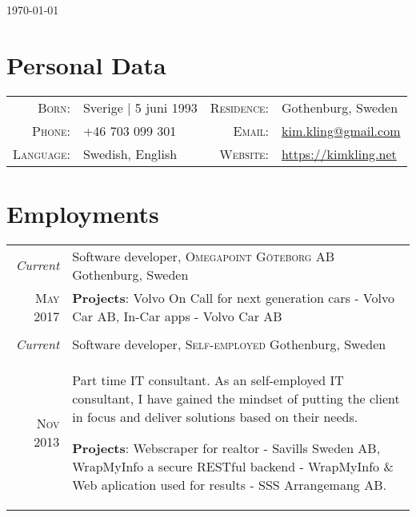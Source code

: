 \documentclass[a4paper,10pt]{scrartcl} %
\begin{document}
\pagestyle{empty} %


\hfill {\small \today}
\par{
	\bigskip\par
	
}



\section{Personal Data}
\begin{tabular}{rp{6cm}rl}
	\textsc{Born:}      & Sverige | 5 juni 1993 &
	\textsc{Residence:} & Gothenburg, Sweden \\

	\textsc{Phone:}     & +46 703 099 301 & 
	\textsc{Email:}     & \href{mailto:kim.kling@gmail.com}{kim.kling@gmail.com} \\

	\textsc{Language:}  & Swedish, English & 
	\textsc{Website:}   & \href{https://kimkling.net}{https://kimkling.net}
\end{tabular}



\section{Employments}

\begin{tabular}{r|p{15cm}}
\emph{Current} 	                    & Software developer, \textsc{Omegapoint Göteborg AB} \hfill Gothenburg, Sweden \\
\textsc{May 2017}                   & \footnotesize{
\textbf{Projects}: Volvo On Call for next generation cars - Volvo Car AB, In-Car apps - Volvo Car AB} \\
\multicolumn{2}{c}{} \\


\emph{Current} 	                    & Software developer, \textsc{Self-employed} \hfill Gothenburg, Sweden \\
\phantom{ab} \textsc{Nov 2013} 	    & \footnotesize{Part time IT consultant. As an self-employed IT consultant, I have gained the mindset of putting the client in focus and deliver solutions based on their needs.

\textbf{Projects}: Webscraper for realtor - Savills Sweden AB, WrapMyInfo a secure RESTful backend - WrapMyInfo \& Web aplication used for results - SSS Arrangemang AB.} \\

\end{tabular}
\end{document}
